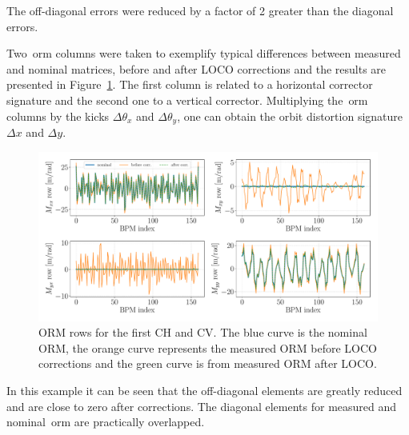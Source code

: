 The off-diagonal errors were reduced by a factor of 2 greater than the diagonal errors.

Two~\gls{orm} columns were taken to exemplify typical differences between measured and nominal matrices, before and after LOCO corrections and the results are presented in Figure~\ref{fig:orm_rows}. The first column is related to a horizontal corrector signature and the second one to a vertical corrector. Multiplying the~\gls{orm} columns by the kicks $\Delta\theta_x$ and $\Delta\theta_y$, one can obtain the orbit distortion signature $\Delta x$ and $\Delta y$.
\begin{figure}
\centering
\includegraphics[width=1.0\textwidth]{figures/nominal_measured_after_before_loco_big.pdf}
\caption{ORM rows for the first CH and CV. The blue curve is the nominal ORM, the orange curve represents the measured ORM before LOCO corrections and the green curve is from measured ORM after LOCO.}
\label{fig:orm_rows}
\end{figure}

In this example it can be seen that the off-diagonal elements are greatly reduced and are close to zero after corrections. The diagonal elements for measured and nominal~\gls{orm} are practically overlapped.

